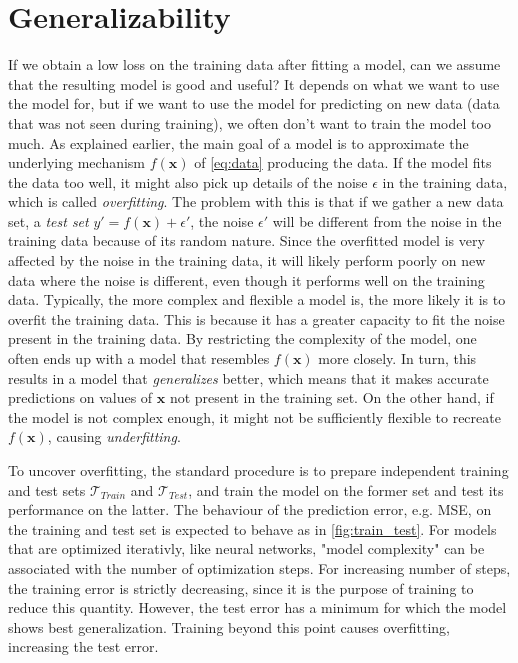 \section{Generalizability}\label{sec:Generalizability}
If we obtain a low loss on the training data after fitting a model, can we assume that the resulting model is good and useful? It depends on what we want to use the model for, but if we want to use the model for predicting on new data (data that was not seen during training), we often don't want to train the model too much. As explained earlier, the main goal of a model is to approximate the underlying mechanism $f(\boldsymbol{x})$ of \cref{eq:data} producing the data. If the model fits the data too well, it might also pick up details of the noise $\epsilon$ in the training data, which is called \emph{overfitting}. The problem with this is that if we gather a new data set, a \emph{test set} $y' = f(\boldsymbol{x}) + \epsilon'$, the noise $\epsilon'$ will be different from the noise in the training data because of its random nature. Since the overfitted model is very affected by the noise in the training data, it will likely perform poorly on new data where the noise is different, even though it performs well on the training data. Typically, the more complex and flexible a model is, the more likely it is to overfit the training data. This is because it has a greater capacity to fit the noise present in the training data. By restricting the complexity of the model, one often ends up with a model that resembles $f(\boldsymbol{x})$ more closely. In turn, this results in a model
that \emph{generalizes} better, which means that it makes accurate predictions on values of $\boldsymbol{x}$ not present in the training set. On the other hand, if the model is not complex enough, it might not be sufficiently flexible to recreate $f(\boldsymbol{x})$, causing \emph{underfitting}.

To uncover overfitting, the standard procedure is to prepare independent training and test sets $\mathcal{T}_{Train}$ and $\mathcal{T}_{Test}$, and train the model on the former set and test its performance on the latter. The behaviour of the prediction error, e.g. MSE, on the training and test set is expected to behave as in \cref{fig:train_test}. For models that are optimized iterativly, like neural networks, "model complexity" can be associated with the number of optimization steps. For increasing number of steps, the training error is strictly decreasing, since it is the purpose of training to reduce this quantity. However, the test error has a minimum for which the model shows best generalization. Training beyond this point causes overfitting, increasing the test error. 

